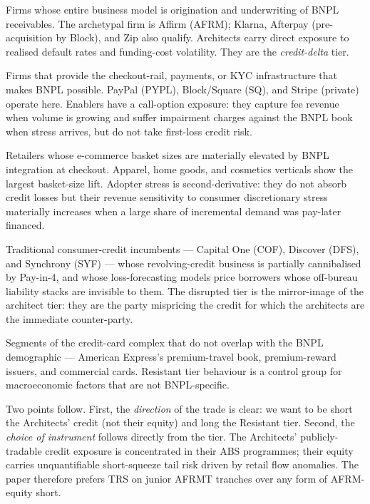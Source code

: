 \documentclass[11pt,letterpaper]{article}
\begin{document}
\begin{description}[leftmargin=2em,style=nextline]
\item[Tier 1 --- Architects.] Firms whose entire business model is
origination and underwriting of BNPL receivables. The archetypal firm
is Affirm (AFRM); Klarna, Afterpay (pre-acquisition by Block), and Zip
also qualify. Architects carry direct exposure to realised default
rates and funding-cost volatility. They are the \emph{credit-delta}
tier.
\item[Tier 2 --- Enablers.] Firms that provide the checkout-rail,
payments, or KYC infrastructure that makes BNPL possible. PayPal
(PYPL), Block/Square (SQ), and Stripe (private) operate here.
Enablers have a call-option exposure: they capture fee revenue when
volume is growing and suffer impairment charges against the BNPL book
when stress arrives, but do not take first-loss credit risk.
\item[Tier 3 --- Adopters.] Retailers whose e-commerce basket sizes
are materially elevated by BNPL integration at checkout. Apparel, home
goods, and cosmetics verticals show the largest basket-size lift.
Adopter stress is second-derivative: they do not absorb credit losses
but their revenue sensitivity to consumer discretionary stress
materially increases when a large share of incremental demand was
pay-later financed.
\item[Tier 4 --- Disrupted.] Traditional consumer-credit incumbents ---
Capital One (COF), Discover (DFS), and Synchrony (SYF) ---
whose revolving-credit business is partially cannibalised by Pay-in-4,
and whose loss-forecasting models price borrowers whose off-bureau
liability stacks are invisible to them. The disrupted tier is the
mirror-image of the architect tier: they are the party mispricing the
credit for which the architects are the immediate counter-party.
\item[Tier 5 --- Resistant.] Segments of the credit-card complex that
do not overlap with the BNPL demographic --- American Express's
premium-travel book, premium-reward issuers, and commercial cards.
Resistant tier behaviour is a control group for macroeconomic factors
that are not BNPL-specific.
\end{description}

Two points follow. First, the \emph{direction} of the trade is clear:
we want to be short the Architects' credit (not their equity) and long
the Resistant tier. Second, the \emph{choice of instrument} follows
directly from the tier. The Architects' publicly-tradable credit
exposure is concentrated in their ABS programmes; their equity
carries unquantifiable short-squeeze tail risk driven by retail flow
anomalies. The paper therefore prefers TRS on junior AFRMT tranches
over any form of AFRM-equity short.
\end{document}
